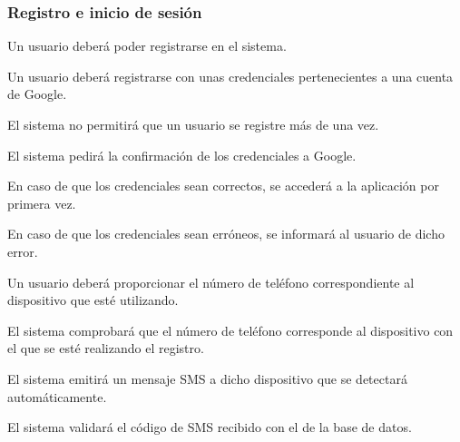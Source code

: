 


\subsubsection*{Registro e inicio de sesión}
\begin{RFGestionUsuarios}
  \item Un usuario deberá poder registrarse en el sistema.\label{req_registro} %
  \begin{RFGestionUsuarios}
    
    \item Un usuario deberá registrarse con unas credenciales pertenecientes a una cuenta de Google.
    \begin{RFGestionUsuarios}
      \item El sistema no permitirá que un usuario se registre más de una vez.
      \item El sistema pedirá la confirmación de los credenciales a Google.
      \begin{RFGestionUsuarios}
      	\item En caso de que los credenciales sean correctos, se accederá a la aplicación por primera vez.
      	\item En caso de que los credenciales sean erróneos, se informará al usuario de dicho error.
       \end{RFGestionUsuarios}
    \end{RFGestionUsuarios}
    
    \item Un usuario deberá proporcionar el número de teléfono correspondiente al dispositivo que esté utilizando.
    \begin{RFGestionUsuarios}
    	\item El sistema comprobará que el número de teléfono corresponde al dispositivo con el que se esté realizando el registro.
    	\begin{RFGestionUsuarios}
     		\item El sistema emitirá un mensaje SMS a dicho dispositivo que se detectará automáticamente.
      		\item El sistema validará el código de SMS recibido con el de la base de datos.
    	\end{RFGestionUsuarios}
   	\end{RFGestionUsuarios} 
   	

\end{RFGestionUsuarios}
\end{RFGestionUsuarios}
